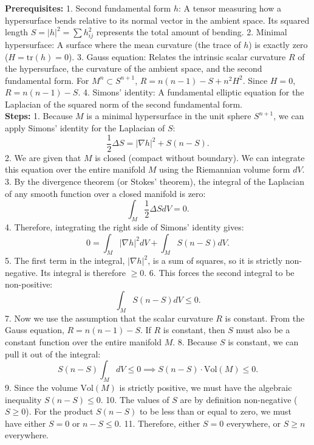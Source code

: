 \begin{solution}
\textbf{Prerequisites:}
1. Second fundamental form $h$: A tensor measuring how a hypersurface bends relative to its normal vector in the ambient space. Its squared length $S = |h|^2 = \sum h_{ij}^2$ represents the total amount of bending.
2. Minimal hypersurface: A surface where the mean curvature (the trace of $h$) is exactly zero ($H = \text{tr}(h) = 0$).
3. Gauss equation: Relates the intrinsic scalar curvature $R$ of the hypersurface, the curvature of the ambient space, and the second fundamental form. For $M^n \subset S^{n+1}$, $R = n(n-1) - S + n^2 H^2$. Since $H=0$, $R = n(n-1) - S$.
4. Simons' identity: A fundamental elliptic equation for the Laplacian of the squared norm of the second fundamental form.\\[2ex]

\textbf{Steps:}
1. Because $M$ is a minimal hypersurface in the unit sphere $S^{n+1}$, we can apply Simons' identity for the Laplacian of $S$:
   \[ \frac{1}{2} \Delta S = |\nabla h|^2 + S(n - S). \]
2. We are given that $M$ is closed (compact without boundary). We can integrate this equation over the entire manifold $M$ using the Riemannian volume form $dV$.
3. By the divergence theorem (or Stokes' theorem), the integral of the Laplacian of any smooth function over a closed manifold is zero:
   \[ \int_M \frac{1}{2} \Delta S dV = 0. \]
4. Therefore, integrating the right side of Simons' identity gives:
   \[ 0 = \int_M |\nabla h|^2 dV + \int_M S(n - S) dV. \]
5. The first term in the integral, $|\nabla h|^2$, is a sum of squares, so it is strictly non-negative. Its integral is therefore $\ge 0$.
6. This forces the second integral to be non-positive:
   \[ \int_M S(n - S) dV \le 0. \]
7. Now we use the assumption that the scalar curvature $R$ is constant. From the Gauss equation, $R = n(n-1) - S$. If $R$ is constant, then $S$ must also be a constant function over the entire manifold $M$.
8. Because $S$ is constant, we can pull it out of the integral:
   \[ S(n - S) \int_M dV \le 0 \implies S(n - S) \cdot \text{Vol}(M) \le 0. \]
9. Since the volume $\text{Vol}(M)$ is strictly positive, we must have the algebraic inequality $S(n - S) \le 0$.
10. The values of $S$ are by definition non-negative ($S \ge 0$). For the product $S(n-S)$ to be less than or equal to zero, we must have either $S = 0$ or $n - S \le 0$.
11. Therefore, either $S = 0$ everywhere, or $S \ge n$ everywhere.\\[2ex]


\end{solution}
